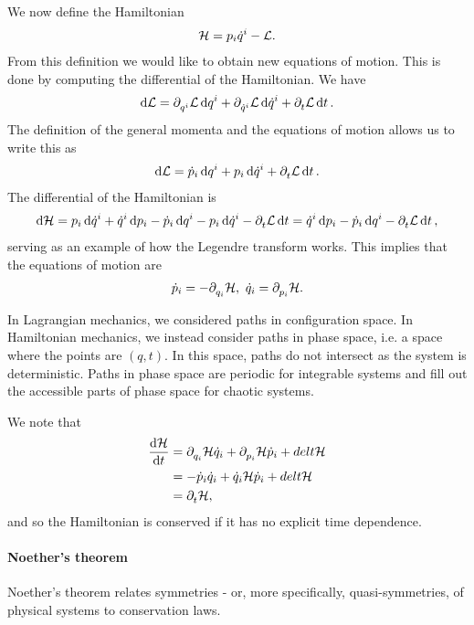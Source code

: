 We now define the Hamiltonian
\begin{align*}
	\mathcal{H} = p_{i}\dot{q}^{i} - \mathcal{L}.
\end{align*}
From this definition we would like to obtain new equations of motion. This is done by computing the differential of the Hamiltonian. We have
\begin{align*}
	\dd{\mathcal{L}} = \partial^{}_{q^{i}}\mathcal{L}\dd{q^{i}} + \partial^{}_{\dot{q}^{i}}\mathcal{L}\dd{\dot{q}^{i}} + \partial^{}_{t}\mathcal{L}\dd{t}.
\end{align*}
The definition of the general momenta and the equations of motion allows us to write this as
\begin{align*}
	\dd{\mathcal{L}} = \dot{p}_{i}\dd{q^{i}} + p_{i}\dd{\dot{q}^{i}} + \partial^{}_{t}\mathcal{L}\dd{t}.
\end{align*}
The differential of the Hamiltonian is
\begin{align*}
	\dd{\mathcal{H}} = p_{i}\dd{\dot{q}^{i}} + \dot{q}^{i}\dd{p_{i}} - \dot{p}_{i}\dd{q^{i}} - p_{i}\dd{\dot{q}^{i}} - \partial^{}_{t}\mathcal{L}\dd{t} = \dot{q}^{i}\dd{p_{i}} - \dot{p}_{i}\dd{q^{i}} - \partial^{}_{t}\mathcal{L}\dd{t},
\end{align*}
serving as an example of how the Legendre transform works. This implies that the equations  of motion are
\begin{align*}
	\dot{p}_{i} = -\partial^{}_{q_{i}}\mathcal{H},\ \dot{q}_{i} = \partial^{}_{p_{i}}\mathcal{H}.
\end{align*}

In Lagrangian mechanics, we considered paths in configuration space. In Hamiltonian mechanics, we instead consider paths in phase space, i.e. a space where the points are $(q, t)$. In this space, paths do not intersect as the system is deterministic. Paths in phase space are periodic for integrable systems and fill out the accessible parts of phase space for chaotic systems.

We note that
\begin{align*}
	\dv{\mathcal{H}}{t} &= \partial^{}_{q_{i}}\mathcal{H}\dot{q}_{i} + \partial^{}_{p_{i}}\mathcal{H}\dot{p}_{i} + del{t}{\mathcal{H}} \\
	             &= -\dot{p}_{i}\dot{q}_{i} + \dot{q}_{i}{\mathcal{H}}\dot{p}_{i} + del{t}{\mathcal{H}} \\
	             &= \partial^{}_{t}\mathcal{H},
\end{align*}
and so the Hamiltonian is conserved if it has no explicit time dependence.



\paragraph{Noether's theorem}
Noether's theorem relates symmetries - or, more specifically, quasi-symmetries, of physical systems to conservation laws.

